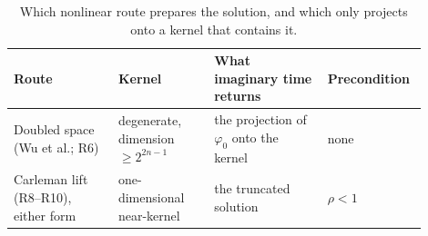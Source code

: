 \begin{table}[htbp]
    \centering
    \caption{Which nonlinear route prepares the solution, and which only projects onto a kernel that contains it.}
    \label{tab:prep-vs-proj}
    \small
    \begin{tabular}{@{}p{0.24\linewidth} p{0.22\linewidth} p{0.26\linewidth} p{0.18\linewidth}@{}}
        \toprule
        Route & Kernel & What imaginary time returns & Precondition \\
        \midrule
        Doubled space (Wu et al.; R6) & degenerate, dimension $\ge 2^{2n-1}$ & the projection of $\varphi_0$ onto the kernel & none \\
        Carleman lift (R8--R10), either form & one-dimensional near-kernel & the truncated solution & $\rho < 1$ \\
        \bottomrule
    \end{tabular}
\end{table}

